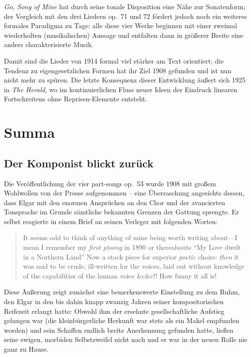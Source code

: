 \documentclass[a4paper,11pt,open=any]{scrbook}
\newcommand{\engquote}[1]{\foreignblockquote{english}{#1}}
\begin{document}
\textit{Go, Song of Mine} hat durch seine tonale Disposition eine Nähe
zur Sonatenform; der Vergleich mit den drei Liedern op.~71 und 72 fördert
jedoch noch ein weiteres formales Paradigma zu Tage: alle diese vier Werke
beginnen mit einer zweimal wiederholten (musikalischen) Aussage und
entfalten dann in größerer Breite eine anders charakterisierte Musik.

Damit sind die Lieder von 1914 formal viel stärker am Text orientiert; die
Tendenz zu eigengesetzlichen Formen hat ihr Ziel 1908 gefunden und ist nun
nicht mehr zu spüren.  Die letzte Konsequenz dieser Entwicklung äußert sich
1925 in \textit{The Herald}, wo im kontinuierlichen Fluss neuer Ideen der
Eindruck linearen Fortschreitens ohne Reprisen-Elemente entsteht.



\chapter{Summa}

\section{Der Komponist blickt zurück}
Die Veröffentlichung der vier part-songs op.~53 wurde 1908 mit großem
Wohlwollen von der Presse aufgenommen – eine Überraschung angesichts dessen,
dass Elgar mit den enormen Ansprüchen an den Chor und der avancierten
Tonsprache im Grunde sämtliche bekannten Grenzen der Gattung sprengte.  Er
selbst reagierte in einem Brief an seinen Verleger mit folgenden Worten:

\engquote{It seems odd to think of anything of mine being worth writing
about—I mean I remember my \emph{first ptsong} in 1890 or thereabouts
\enquote{My Love dwelt in a Northern Land} Now a stock piece for superior
\emph{poetic} choirs: \emph{then} it was said to be crude, ill-written for
the voices, laid out without knowledge of the capabilities of the human
voice \&c\&c!!  How funny it all is!\cite[Bd.~2, S.~693]{elgar-publ}}

Diese Äußerung zeigt zunächst eine bemerkenswerte Einstellung zu dem Ruhm,
den Elgar in den bis dahin knapp zwanzig Jahren seiner kompositorischen
Reifezeit erlangt hatte: Obwohl ihm der ersehnte gesellschaftliche Aufstieg
gelungen war (die kleinbürgerliche Herkunft war stets als ein Makel empfunden
worden) und sein Schaffen endlich breite Anerkennung gefunden hatte, ließen
seine ewigen, morbiden Selbstzweifel nicht nach und er war in der neuen
Rolle nie ganz zu Hause.
\end{document}

